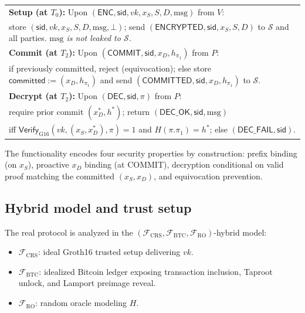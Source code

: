 \documentclass[11pt]{article}
\newcommand{\msg}{\mathrm{msg}}
\begin{document}
\begin{center}
\begin{tabular}{@{}p{15cm}@{}}
\toprule
\textbf{Setup (at $T_0$):} Upon $(\mathsf{ENC}, \mathsf{sid}, vk, x_S, S, D, \msg)$ from $V$: \\
\quad store $(\mathsf{sid}, vk, x_S, S, D, \msg, \bot)$; send
$(\mathsf{ENCRYPTED}, \mathsf{sid}, x_S, S, D)$ to $\mathcal{S}$ and
all parties. \emph{$\msg$ is not leaked to $\mathcal{S}$.} \\
\midrule
\textbf{Commit (at $T_2$):} Upon $(\mathsf{COMMIT}, \mathsf{sid}, x_D, h_{\pi_1})$ from $P$: \\
\quad if previously committed, reject (equivocation); else store
$\mathsf{committed} := (x_D, h_{\pi_1})$ and send
$(\mathsf{COMMITTED}, \mathsf{sid}, x_D, h_{\pi_1})$ to $\mathcal{S}$. \\
\midrule
\textbf{Decrypt (at $T_2$):} Upon $(\mathsf{DEC}, \mathsf{sid}, \pi)$ from $P$: \\
\quad require prior commit $(x_D^*, h^*)$; return $(\mathsf{DEC\_OK}, \mathsf{sid}, \msg)$ \\
\quad iff $\mathsf{Verify}_{\mathrm{G16}}(vk, (x_S, x_D^*), \pi) = 1$
and $H(\pi.\pi_1) = h^*$; else $(\mathsf{DEC\_FAIL}, \mathsf{sid})$. \\
\bottomrule
\end{tabular}
\end{center}

The functionality encodes four security properties by construction:
prefix binding (on $x_S$), proactive $x_D$ binding (at COMMIT),
decryption conditional on valid proof matching the committed
$(x_S, x_D)$, and equivocation prevention.

\subsection{Hybrid model and trust setup}

The real protocol is analyzed in the
$(\mathcal{F}_{\mathrm{CRS}}, \mathcal{F}_{\mathrm{BTC}}, \mathcal{F}_{\mathrm{RO}})$-hybrid model:
\begin{itemize}
  \item $\mathcal{F}_{\mathrm{CRS}}$: ideal Groth16 trusted setup delivering $vk$.
  \item $\mathcal{F}_{\mathrm{BTC}}$: idealized Bitcoin ledger exposing transaction inclusion, Taproot unlock, and Lamport preimage reveal.
  \item $\mathcal{F}_{\mathrm{RO}}$: random oracle modeling $H$.
\end{itemize}
\end{document}
